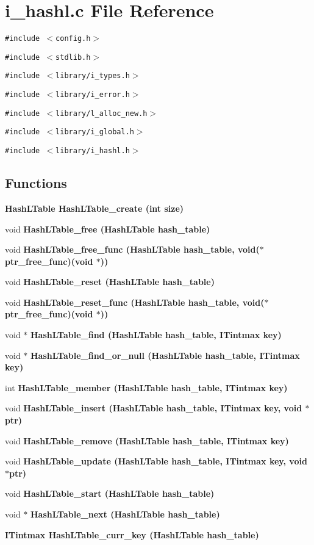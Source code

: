 \section{i\_\-hashl.c File Reference}
\label{i__hashl_8c}
{\tt \#include $<$config.h$>$}\par
{\tt \#include $<$stdlib.h$>$}\par
{\tt \#include $<$library/i\_\-types.h$>$}\par
{\tt \#include $<$library/i\_\-error.h$>$}\par
{\tt \#include $<$library/l\_\-alloc\_\-new.h$>$}\par
{\tt \#include $<$library/i\_\-global.h$>$}\par
{\tt \#include $<$library/i\_\-hashl.h$>$}\par
\subsection*{Functions}
\begin{CompactItemize}
\item 
\bf{Hash\-LTable} \bf{Hash\-LTable\_\-create} (int size)
\item 
void \bf{Hash\-LTable\_\-free} (\bf{Hash\-LTable} hash\_\-table)
\item 
void \bf{Hash\-LTable\_\-free\_\-func} (\bf{Hash\-LTable} hash\_\-table, void($\ast$ptr\_\-free\_\-func)(void $\ast$))
\item 
void \bf{Hash\-LTable\_\-reset} (\bf{Hash\-LTable} hash\_\-table)
\item 
void \bf{Hash\-LTable\_\-reset\_\-func} (\bf{Hash\-LTable} hash\_\-table, void($\ast$ptr\_\-free\_\-func)(void $\ast$))
\item 
void $\ast$ \bf{Hash\-LTable\_\-find} (\bf{Hash\-LTable} hash\_\-table, \bf{ITintmax} key)
\item 
void $\ast$ \bf{Hash\-LTable\_\-find\_\-or\_\-null} (\bf{Hash\-LTable} hash\_\-table, \bf{ITintmax} key)
\item 
int \bf{Hash\-LTable\_\-member} (\bf{Hash\-LTable} hash\_\-table, \bf{ITintmax} key)
\item 
void \bf{Hash\-LTable\_\-insert} (\bf{Hash\-LTable} hash\_\-table, \bf{ITintmax} key, void $\ast$ptr)
\item 
void \bf{Hash\-LTable\_\-remove} (\bf{Hash\-LTable} hash\_\-table, \bf{ITintmax} key)
\item 
void \bf{Hash\-LTable\_\-update} (\bf{Hash\-LTable} hash\_\-table, \bf{ITintmax} key, void $\ast$ptr)
\item 
void \bf{Hash\-LTable\_\-start} (\bf{Hash\-LTable} hash\_\-table)
\item 
void $\ast$ \bf{Hash\-LTable\_\-next} (\bf{Hash\-LTable} hash\_\-table)
\item 
\bf{ITintmax} \bf{Hash\-LTable\_\-curr\_\-key} (\bf{Hash\-LTable} hash\_\-table)
\end{CompactItemize}
